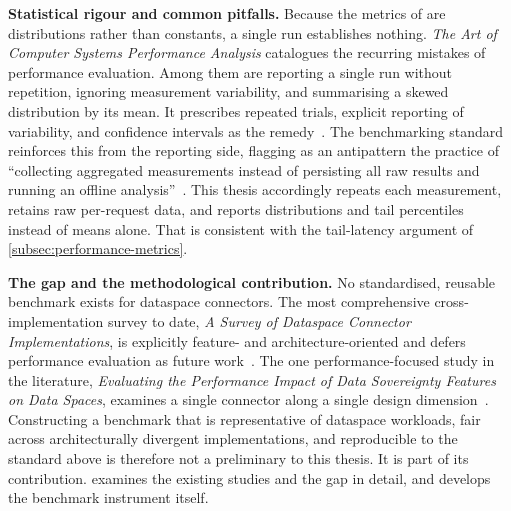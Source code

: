 \textbf{Statistical rigour and common pitfalls.} Because the metrics of  are distributions rather than constants, a single run establishes nothing. \emph{The Art of Computer Systems Performance Analysis} catalogues the recurring mistakes of performance evaluation. Among them are reporting a single run without repetition, ignoring measurement variability, and summarising a skewed distribution by its mean. It prescribes repeated trials, explicit reporting of variability, and confidence intervals as the remedy~\citep{jain1991art}. The benchmarking standard reinforces this from the reporting side, flagging as an antipattern the practice of ``collecting aggregated measurements instead of persisting all raw results and running an offline analysis''~\citep{empiricalStandardsBenchmarking}. This thesis accordingly repeats each measurement, retains raw per-request data, and reports distributions and tail percentiles instead of means alone. That is consistent with the tail-latency argument of \cref{subsec:performance-metrics}.

\textbf{The gap and the methodological contribution.} No standardised, reusable benchmark exists for dataspace connectors. The most comprehensive cross-implementation survey to date, \emph{A Survey of Dataspace Connector Implementations}, is explicitly feature- and architecture-oriented and defers performance evaluation as future work~\citep{dam2024surveydataspaceconnectorimplementations}. The one performance-focused study in the literature, \emph{Evaluating the Performance Impact of Data Sovereignty Features on Data Spaces}, examines a single connector along a single design dimension~\citep{evaluatingtheperformanceimpactofdatasovereignty}. Constructing a benchmark that is representative of dataspace workloads, fair across architecturally divergent implementations, and reproducible to the standard above is therefore not a preliminary to this thesis. It is part of its contribution.  examines the existing studies and the gap in detail, and  develops the benchmark instrument itself.

